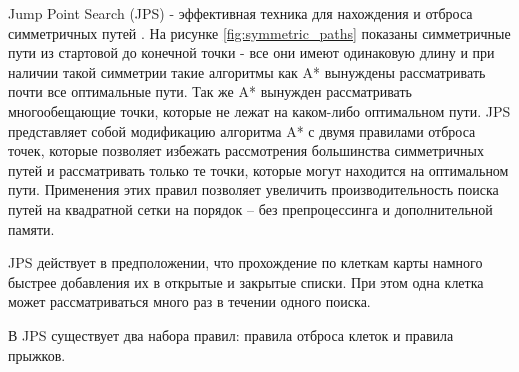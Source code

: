 Jump Point Search (JPS) - эффективная техника для нахождения и отброса симметричных путей \cite{IMPROVING_JPS}. На рисунке \ref{fig:symmetric_paths} показаны симметричные пути из стартовой до конечной точки - все они имеют одинаковую длину и при наличии такой симметрии такие алгоритмы как A* вынуждены рассматривать почти все оптимальные пути. Так же A* вынужден рассматривать многообещающие точки, которые не лежат на каком-либо оптимальном пути. JPS представляет собой модификацию алгоритма A* с двумя правилами отброса точек, которые позволяет избежать рассмотрения большинства симметричных путей и рассматривать только те точки, которые могут находится на оптимальном пути. Применения этих правил позволяет увеличить производительность поиска путей на квадратной сетки на порядок -- без препроцессинга и дополнительной памяти.

{
	\mybox[x=1,y=1,color=green]
	\mybox[x=4,y=4,color=green]
	
	\mygrid[width=6, height=6]
	
	\myarrow[startx=1,starty=1,endx=1,endy=2,color=blue]
	\myarrow[startx=1,starty=2,endx=1,endy=3,color=blue]
	\myarrow[startx=1,starty=3,endx=1,endy=4,color=blue]
	\myarrow[startx=1,starty=4,endx=2,endy=4,color=blue]
	\myarrow[startx=2,starty=4,endx=3,endy=4,color=blue]
	\myarrow[startx=3,starty=4,endx=4,endy=4,color=blue]
	
	\myarrow[startx=4,starty=1,endx=4,endy=2,color=orange]
	\myarrow[startx=4,starty=2,endx=4,endy=3,color=orange]
	\myarrow[startx=4,starty=3,endx=4,endy=4,color=orange]
	\myarrow[startx=1,starty=1,endx=2,endy=1,color=orange]
	\myarrow[startx=2,starty=1,endx=3,endy=1,color=orange]
	\myarrow[startx=3,starty=1,endx=4,endy=1,color=orange]
	
	\myarrow[startx=1,starty=2,endx=2,endy=2,color=red]
	\myarrow[startx=2,starty=2,endx=3,endy=2,color=red]
	\myarrow[startx=3,starty=2,endx=4,endy=2,color=red]
	
	\myarrow[startx=1,starty=3,endx=2,endy=3,color=black]
	\myarrow[startx=2,starty=3,endx=3,endy=3,color=black]
	\myarrow[startx=3,starty=3,endx=4,endy=3,color=black]
}


JPS действует в предположении, что прохождение по клеткам карты намного быстрее добавления их в открытые и закрытые списки. При этом одна клетка может рассматриваться много раз в течении одного поиска.

В JPS существует два набора правил: правила отброса клеток и правила прыжков.


